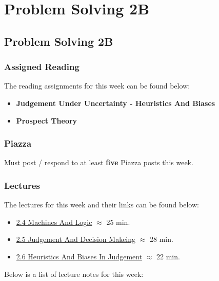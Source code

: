 \clearpage

\renewcommand{\ChapTitle}{Problem Solving 2B}
\renewcommand{\SectionTitle}{Problem Solving 2B}

\chapter{\ChapTitle}
\section{\SectionTitle}

\subsection{Assigned Reading}

The reading assignments for this week can be found below:

\begin{itemize}
    \item \textbf{Judgement Under Uncertainty - Heuristics And Biases}
    \item \textbf{Prospect Theory}
\end{itemize}

\subsection{Piazza}

Must post / respond to at least \textbf{five} Piazza posts this week.

\subsection{Lectures}

The lectures for this week and their links can be found below:

\begin{itemize}
    \item \href{https://www.youtube.com/watch?v=8h0okzEM13M}{2.4 Machines And Logic} $\approx$ 25 min.
    \item \href{https://www.youtube.com/watch?v=IdZDwzxaCIY}{2.5 Judgement And Decision Makeing} $\approx$ 28 min.
    \item \href{https://www.youtube.com/watch?v=l6-UHqMy4Gg}{2.6 Heuristics And Biases In Judgement} $\approx$ 22 min.
\end{itemize}

\noindent Below is a list of lecture notes for this week:

